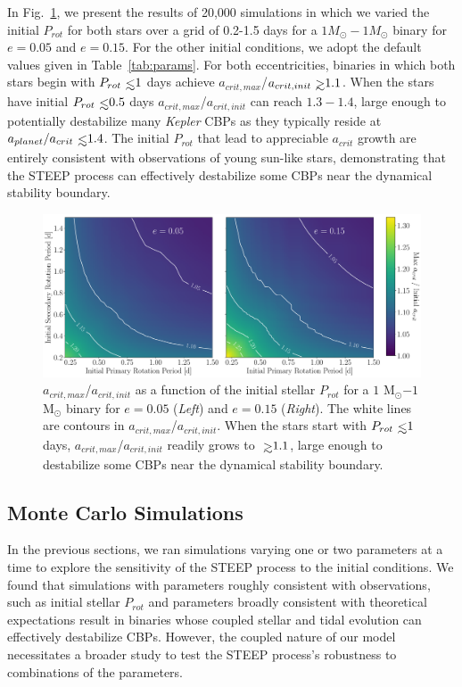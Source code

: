 In Fig.~\ref{fig:GG_contour}, we present the results of 20,000 simulations in which we varied the initial $P_{rot}$ for both stars over a grid of 0.2-1.5 days for a $1 M_{\odot} - 1 M_{\odot}$ binary for $e=0.05$ and $e=0.15$.  For the other initial conditions, we adopt the default values given in Table~\ref{tab:params}.  For both eccentricities, binaries in which both stars begin with $P_{rot} \lsim 1$ days achieve $a_{crit,max}$/$a_{crit,init} \gsim 1.1$.  When the stars have initial $P_{rot} \lsim 0.5$ days $a_{crit,max}$/$a_{crit,init}$ can reach $1.3-1.4$, large enough to potentially destabilize many {\it Kepler} CBPs as they typically reside at $a_{planet}/a_{crit} \lsim 1.4$.  The initial $P_{rot}$ that lead to appreciable $a_{crit}$ growth are entirely consistent with observations of young sun-like stars, demonstrating that the STEEP process can effectively destabilize some CBPs near the dynamical stability boundary.

\begin{figure}[t]
	\includegraphics[width=\textwidth]{GG_contour.pdf}
    \caption{$a_{crit,max}$/$a_{crit,init}$ as a function of the initial stellar $P_{rot}$ for a $1$ M$_{\odot}$$-1$ M$_{\odot}$ binary for $e = 0.05$ ({\it Left}) and $e = 0.15$ ({\it Right}).  The white lines are contours in $a_{crit,max}$/$a_{crit,init}$.  When the stars start with $P_{rot} \lsim 1$ days, $a_{crit,max}$/$a_{crit,init}$ readily grows to $\gsim 1.1$, large enough to destabilize some CBPs near the dynamical stability boundary.}
    \label{fig:GG_contour}
\end{figure}

\subsection{Monte Carlo Simulations} \label{sec:monte_carlo}

In the previous sections, we ran simulations varying one or two parameters at a time to explore the sensitivity of the STEEP process to the initial conditions.  We found that simulations with parameters roughly consistent with observations, such as initial stellar $P_{rot}$ and parameters broadly consistent with theoretical expectations result in binaries whose coupled stellar and tidal evolution can effectively destabilize CBPs.  However, the coupled nature of our model necessitates a broader study to test the STEEP process's robustness to combinations of the parameters.

